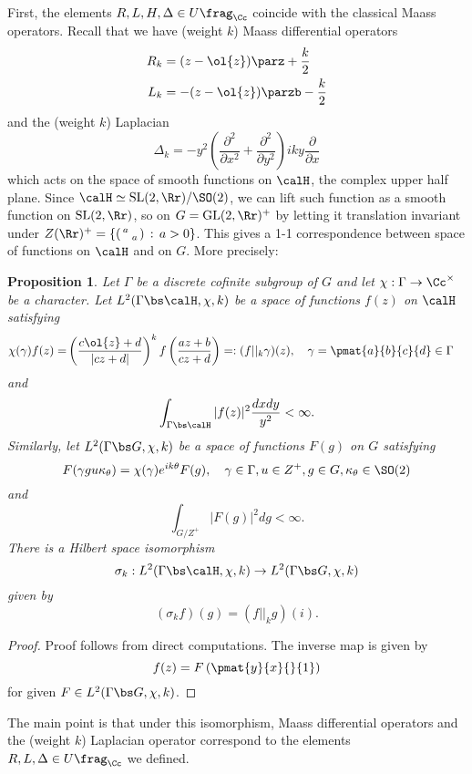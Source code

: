 \documentclass{article}
\newcommand{\GL}{\mathrm{GL}}
\newcommand{\SL}{\mathrm{SL}}
\newcommand{\smat}[4]{\left(\begin{smallmatrix} #1 & #2 \\ #3 & #4 \end{smallmatrix}\right)}
\newtheorem{proposition}{Proposition}[section]
\begin{document}
First, the elements $R, L, H, \Delta \in U\frag_{\Cc}$ coincide with the classical Maass operators.
Recall that we have (weight $k$) Maass differential operators
\begin{align*}
R_{k} &= (z-\ol{z}) \parz + \frac{k}{2} \\
L_{k} &= -(z-\ol{z}) \parzb - \frac{k}{2}
\end{align*}
and the (weight $k$) Laplacian
$$
\Delta_{k} = -y^{2}\left( \frac{\partial^{2}}{\partial x^{2}} + \frac{\partial^{2}}{\partial y^{2}} \right) iky \frac{\partial}{\partial x}
$$
which acts on the space of smooth functions on $\calH$, the complex upper half plane. 
Since $\calH \simeq \SL(2, \Rr) / \SO(2)$, we can lift such function as a smooth function on $\SL(2, \Rr)$, so on $G = \GL(2, \Rr)^{+}$ by letting it translation invariant under $Z(\Rr)^{+} = \{ \smat{a}{}{}{a}\,:\, a>0\}$. 
This gives a 1-1 correspondence between space of functions on $\calH$ and on $G$. More precisely:
\begin{proposition}
Let $\Gamma$ be a discrete cofinite subgroup of $G$ and let $\chi:\Gamma \to \Cc^{\times}$ be a character. 
Let $L^{2}(\Gamma \bs \calH, \chi, k)$ be a space of functions $f(z)$ on $\calH$ satisfying
\begin{align*}
\chi(\gamma)f(z) = &\left(\frac{c\ol{z} + d}{|cz+d|}\right)^{k} f\left( \frac{az+b}{cz+d}\right)=:(f||_{k}\gamma)(z), \quad \gamma = \pmat{a}{b}{c}{d} \in \Gamma 
\end{align*}
and
\begin{align*}
\int_{\Gamma\bs \calH} |f(z)|^{2} \frac{dxdy}{y^{2}} <\infty.
\end{align*}
Similarly, let $L^{2}(\Gamma \bs G, \chi, k)$ be a space of functions $F(g)$ on $G$ satisfying 
$$
F(\gamma g u \kappa_{\theta}) = \chi(\gamma)e^{ik\theta}F(g), \quad \gamma\in \Gamma, u\in Z^{+}, g\in G, \kappa_{\theta}\in \SO(2)
$$
and
$$
\int_{G/Z^{+}} |F(g)|^{2} dg <\infty.
$$
There is a Hilbert space isomorphism 
$$
\sigma_k : L^{2}(\Gamma \bs \calH, \chi, k) \to L^{2}(\Gamma \bs G, \chi, k)
$$
given by 
$$
(\sigma_k f)(g) = (f||_{k}g)(i).
$$
\end{proposition}
\begin{proof}
Proof follows from direct computations. The inverse map is given by 
$$
f(z) = F\left(\pmat{y}{x}{}{1}\right)
$$
for given $F\in L^{2}(\Gamma \bs G, \chi, k)$. 
\end{proof}
The main point is that under this isomorphism, Maass differential operators and the (weight $k$) Laplacian operator correspond to the elements $R, L, \Delta \in U\frag_{\Cc}$ we defined. 
\end{document}

